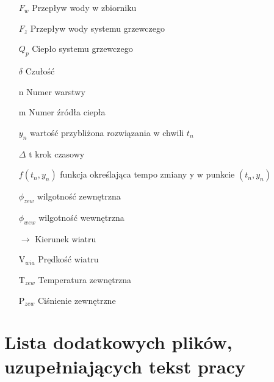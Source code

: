 \documentclass[a4paper,twoside,12pt]{book}
\begin{document}
\begin{appendices}
\begin{itemize}
    \item[$F_w$] Przepływ wody w zbiorniku
    \item[$F_z$] Przepływ wody systemu grzewczego
    \item[$Q_p$] Ciepło systemu grzewczego
    \item[$\delta$] Czułość
    \item[n] Numer warstwy
    \item[m] Numer źródła ciepła
    \item[$y_n$] wartość przybliżona rozwiązania w chwili $t_n$
    \item[$\Delta$ t] krok czasowy
    \item[$f(t_n, y_n)$] funkcja określająca tempo zmiany y w punkcie $(t_n, y_n)$
    \item[$\phi_{zew}$] wilgotność zewnętrzna
    \item[$\phi_{wew}$] wilgotność wewnętrzna
    \item[$\longrightarrow$] Kierunek wiatru
    \item[V$_{wia}$] Prędkość wiatru
    \item[T$_{zew}$] Temperatura zewnętrzna
    \item[P$_{zew}$] Ciśnienie zewnętrzne
  \end{itemize}



  \chapter{Lista dodatkowych plików, uzupełniających tekst pracy}


\end{appendices}
\end{document}
